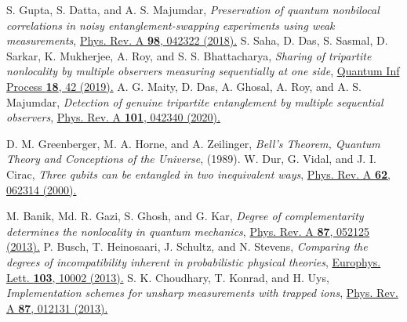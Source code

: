 \documentclass[pra,a4paper,aps,twocolumn,showpacs,superscriptaddress,groupedaddress]{revtex4}
\begin{document}
\begin{thebibliography}{1}
 S. Gupta, S. Datta, and A. S. Majumdar, \emph{Preservation of quantum nonbilocal correlations in noisy entanglement-swapping experiments using weak measurements}, \href{https://journals.aps.org/pra/abstract/10.1103/PhysRevA.98.042322}{Phys. Rev. A {\bf 98}, 042322 (2018).}
 S. Saha, D. Das, S. Sasmal, D. Sarkar, K. Mukherjee, A. Roy, and S. S. Bhattacharya, \emph{Sharing of tripartite nonlocality by multiple observers measuring sequentially at one side}, \href{https://doi.org/10.1007/s11128-018-2161-x}{Quantum Inf Process {\bf 18}, 42 (2019).}
 A. G. Maity, D. Das, A. Ghosal, A. Roy, and A. S. Majumdar, \emph{Detection of genuine tripartite entanglement by multiple sequential observers}, \href{https://journals.aps.org/pra/abstract/10.1103/PhysRevA.101.042340}{Phys. Rev. A {\bf 101}, 042340 (2020).}

 D. M. Greenberger, M. A. Horne, and A. Zeilinger, \emph{Bell's Theorem, Quantum Theory and Conceptions of the Universe}, (1989).
 W. Dur, G. Vidal, and J. I. Cirac, \emph{Three qubits can be entangled in two inequivalent ways}, \href{https://journals.aps.org/pra/abstract/10.1103/PhysRevA.62.062314}{Phys. Rev. A {\bf 62}, 062314 (2000).}

 M. Banik, Md. R. Gazi, S. Ghosh, and G. Kar, \emph{Degree of complementarity determines the nonlocality in quantum mechanics}, \href{https://journals.aps.org/pra/abstract/10.1103/PhysRevA.87.052125}{Phys. Rev. A {\bf 87}, 052125 (2013).}
 P. Busch, T. Heinosaari, J. Schultz, and N. Stevens, \emph{Comparing the degrees of incompatibility inherent in probabilistic physical theories}, \href{https://iopscience.iop.org/article/10.1209/0295-5075/103/10002}{Europhys. Lett. {\bf 103}, 10002 (2013).}
 S. K. Choudhary, T. Konrad, and H. Uys, \emph{Implementation schemes for unsharp measurements with trapped ions}, \href{https://journals.aps.org/pra/abstract/10.1103/PhysRevA.87.012131}{Phys. Rev. A {\bf 87}, 012131 (2013).}


















\end{thebibliography}

\end{document}
